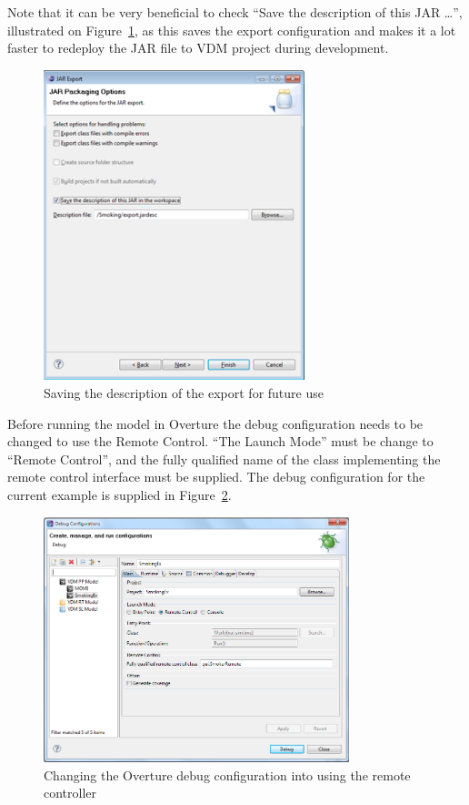 \documentclass{overturerepchap}
\begin{document}
Note that it can be very beneficial to check ``Save the description of this JAR …'', illustrated on Figure~\ref{fig:gui:SaveExport}, as this saves the export configuration and makes it a lot faster to redeploy the JAR file to VDM project during development.  \\

\begin{figure}[h]
\begin{center}
  \includegraphics[width=3in]{figures/SmokersSaveExport}
  \caption[labelInTOC]{Saving the description of the export for future use}
  \label{fig:gui:SaveExport}
\end{center}
\end{figure}

Before running the model in Overture the debug configuration needs to be changed to use the Remote Control. ``The Launch Mode'' must be change to ``Remote Control'', and the fully qualified name of the class implementing the remote control interface must be supplied. The debug configuration for the current example is supplied in Figure~\ref{fig:gui:DebugConfiguration}. \\

\begin{figure}[h]
\begin{center}
  \includegraphics[width=3.5in]{figures/SmokersDebugConfig}
  \caption[labelInTOC]{Changing the Overture debug configuration into using the remote controller}
  \label{fig:gui:DebugConfiguration}
\end{center}
\end{figure}
\end{document}
